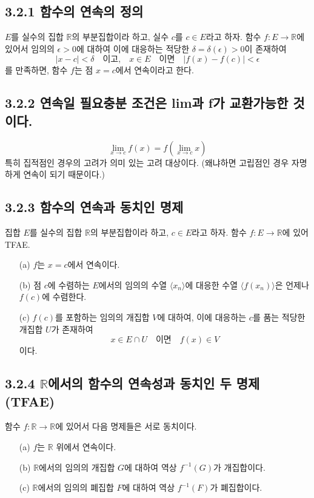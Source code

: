 \documentclass{article}
\begin{document}
\subsection*{\textmd{3.2.1 함수의 연속의 정의}}

$E$를 실수의 집합 $\mathbb{R}$의 부분집합이라 하고, 실수 $c$를 $c \in E$라고 하자. 함수 $f: E \to \mathbb{R}$에 있어서 임의의 $\epsilon > 0$에 대하여 이에 대응하는 적당한 $\delta = \delta(\epsilon) > 0$이 존재하여
\[
|x - c| < \delta \quad \text{이고,} \quad x \in E \quad \text{이면} \quad |f(x) - f(c)| < \epsilon
\]
를 만족하면, 함수 $f$는 점 $x = c$에서 연속이라고 한다.

\subsection*{\textmd{3.2.2 연속일 필요충분 조건은 lim과 f가 교환가능한 것이다.}}

\[
\lim_{x \to c} f(x) = f \left( \lim_{x \to c} x \right)
\]
특히 집적점인 경우의 고려가 의미 있는 고려 대상이다. (왜냐하면 고립점인 경우 자명하게 연속이 되기 때문이다.)

\subsection*{\textmd{3.2.3 함수의 연속과 동치인 명제}}

집합 $E$를 실수의 집합 $\mathbb{R}$의 부분집합이라 하고, $c \in E$라고 하자. 함수 $f: E \to \mathbb{R}$에 있어 TFAE.
\begin{itemize}
    \item[(a)] $f$는 $x = c$에서 연속이다.
    \item[(b)] 점 $c$에 수렴하는 $E$에서의 임의의 수열 $\langle x_n \rangle$에 대응한 수열 $\langle f(x_n) \rangle$은 언제나 $f(c)$에 수렴한다.
    \item[(c)] $f(c)$를 포함하는 임의의 개집합 $V$에 대하여, 이에 대응하는 $c$를 품는 적당한 개집합 $U$가 존재하여
    \[
    x \in E \cap U \quad \text{이면} \quad f(x) \in V
    \]
이다.
\end{itemize}

\subsection*{\textmd{3.2.4 $\mathbb{R}$에서의 함수의 연속성과 동치인 두 명제 (TFAE)}}

함수 $f: \mathbb{R} \to \mathbb{R}$에 있어서 다음 명제들은 서로 동치이다.
\begin{itemize}
    \item[(a)] $f$는 $\mathbb{R}$ 위에서 연속이다.
    \item[(b)] $\mathbb{R}$에서의 임의의 개집합 $G$에 대하여 역상 $f^{-1}(G)$가 개집합이다.
    \item[(c)] $\mathbb{R}$에서의 임의의 폐집합 $F$에 대하여 역상 $f^{-1}(F)$가 폐집합이다.
\end{itemize}
\end{document}
